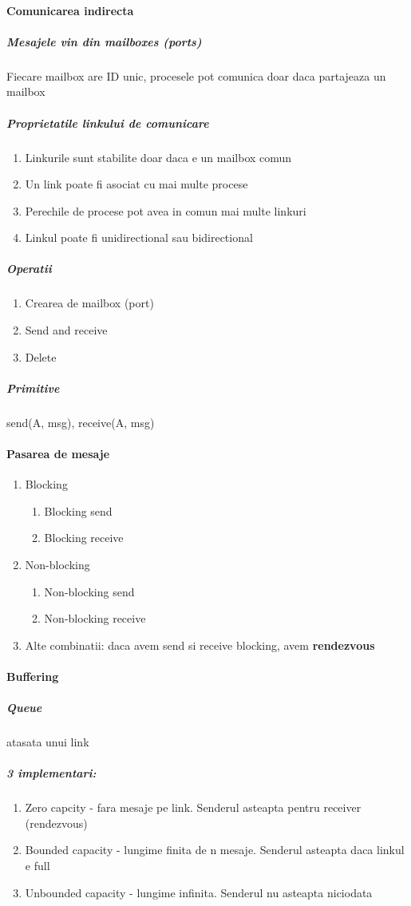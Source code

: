 \documentclass{article}
\begin{document}
\paragraph*{Comunicarea indirecta}
\subparagraph*{Mesajele vin din mailboxes (ports)} Fiecare mailbox are ID unic, procesele pot comunica doar daca partajeaza un mailbox
\subparagraph*{Proprietatile linkului de comunicare}
\begin{enumerate}
    \item Linkurile sunt stabilite doar daca e un mailbox comun
    \item Un link poate fi asociat cu mai multe procese
    \item Perechile de procese pot avea in comun mai multe linkuri
    \item Linkul poate fi unidirectional sau bidirectional
\end{enumerate}
\subparagraph*{Operatii}
\begin{enumerate}
    \item Crearea de mailbox (port)
    \item Send and receive
    \item Delete
\end{enumerate}
\subparagraph*{Primitive} send(A, msg), receive(A, msg)

\paragraph*{Pasarea de mesaje}
\begin{enumerate}
    \item Blocking
          \begin{enumerate}
              \item Blocking send
              \item Blocking receive
          \end{enumerate}
    \item Non-blocking
          \begin{enumerate}
              \item Non-blocking send
              \item Non-blocking receive
          \end{enumerate}
    \item Alte combinatii: daca avem send si receive blocking, avem \textbf{rendezvous}
\end{enumerate}

\paragraph*{Buffering}
\subparagraph*{Queue} atasata unui link
\subparagraph*{3 implementari:}
\begin{enumerate}
    \item Zero capcity - fara mesaje pe link. Senderul asteapta pentru receiver (rendezvous)
    \item Bounded capacity - lungime finita de n mesaje. Senderul asteapta daca linkul e full
    \item Unbounded capacity - lungime infinita. Senderul nu asteapta niciodata
\end{enumerate}
\end{document}
